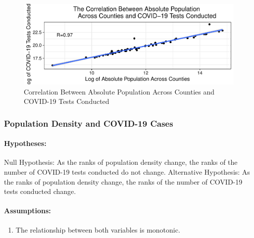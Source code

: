 \documentclass[
  12pt,
]{article}
\newenvironment{Shaded}{\begin{snugshade}}{\end{snugshade}}
\newcommand{\AttributeTok}[1]{\textcolor[rgb]{0.77,0.63,0.00}{#1}}
\newcommand{\CommentTok}[1]{\textcolor[rgb]{0.56,0.35,0.01}{\textit{#1}}}
\newcommand{\FunctionTok}[1]{\textcolor[rgb]{0.00,0.00,0.00}{#1}}
\newcommand{\NormalTok}[1]{#1}
\newcommand{\OtherTok}[1]{\textcolor[rgb]{0.56,0.35,0.01}{#1}}
\newcommand{\SpecialCharTok}[1]{\textcolor[rgb]{0.00,0.00,0.00}{#1}}
\newcommand{\StringTok}[1]{\textcolor[rgb]{0.31,0.60,0.02}{#1}}
\providecommand{\tightlist}{%
  \setlength{\itemsep}{0pt}\setlength{\parskip}{0pt}}
\begin{document}
\begin{figure}

\includegraphics{EDA_Final_Group_Project_files/figure-latex/unnamed-chunk-22-1} \hfill{}

\caption{Correlation Between Absolute Population Across Counties and COVID-19 Tests Conducted}\label{fig:unnamed-chunk-22}
\end{figure}

\hypertarget{population-density-and-covid-19-cases-1}{%
\subsubsection{Population Density and COVID-19
Cases}\label{population-density-and-covid-19-cases-1}}

\hypertarget{hypotheses-4}{%
\paragraph{Hypotheses:}\label{hypotheses-4}}

Null Hypothesis: As the ranks of population density change, the ranks of
the number of COVID-19 tests conducted do not change. Alternative
Hypothesis: As the ranks of population density change, the ranks of the
number of COVID-19 tests conducted change.

\hypertarget{assumptions-4}{%
\paragraph{Assumptions:}\label{assumptions-4}}

\begin{enumerate}
\def\labelenumi{\arabic{enumi}.}
\tightlist
\item
  The relationship between both variables is monotonic.
\end{enumerate}

\begin{Shaded}
\end{Shaded}
\end{document}
